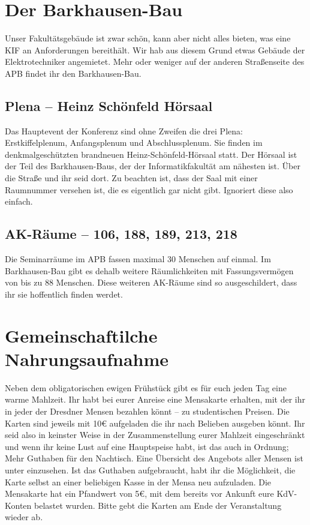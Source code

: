 \pagebreak

\section*{Der Barkhausen-Bau}
Unser Fakultätsgebäude ist zwar schön, kann aber nicht alles bieten, was eine KIF an Anforderungen bereithält.
Wir hab aus diesem Grund etwas Gebäude der Elektrotechniker angemietet.
Mehr oder weniger auf der anderen Straßenseite des APB findet ihr den Barkhausen-Bau.

\subsection*{Plena -- Heinz Schönfeld Hörsaal}
Das Hauptevent der Konferenz sind ohne Zweifen die drei Plena: Erstkiffelplenum, Anfangsplenum und Abschlussplenum.
Sie finden im denkmalgeschützten brandneuen Heinz-Schönfeld-Hörsaal statt.
Der Hörsaal ist der Teil des Barkhausen-Baus, der der Informatikfakultät am nähesten ist.
Über die Straße und ihr seid dort.
Zu beachten ist, dass der Saal mit einer Raumnummer versehen ist, die es eigentlich gar nicht gibt.
Ignoriert diese also einfach.

\subsection*{AK-Räume -- 106, 188, 189, 213, 218}
Die Seminarräume im APB fassen maximal 30 Menschen auf einmal.
Im Barkhausen-Bau gibt es dehalb weitere Räumlichkeiten mit Fassungsvermögen von bis zu 88 Menschen.
Diese weiteren AK-Räume sind so ausgeschildert, dass ihr sie hoffentlich finden werdet.

\section*{Gemeinschaftilche Nahrungsaufnahme}
Neben dem obligatorischen ewigen Frühstück gibt es für euch jeden Tag eine warme Mahlzeit.
Ihr habt bei eurer Anreise eine Mensakarte erhalten, mit der ihr in jeder der Dresdner Mensen bezahlen könnt -- zu studentischen Preisen.
Die Karten sind jeweils mit 10€ aufgeladen die ihr nach Belieben ausgeben könnt.
Ihr seid also in keinster Weise in der Zusammenstellung eurer Mahlzeit eingeschränkt und wenn ihr keine Lust auf eine Hauptspeise habt, ist das auch in Ordnung; Mehr Guthaben für den Nachtisch.
Eine Übersicht des Angebots aller Mensen ist unter  einzusehen.
Ist das Guthaben aufgebraucht, habt ihr die Möglichkeit, die Karte selbst an einer beliebigen Kasse in der Mensa neu aufzuladen.
Die Mensakarte hat ein Pfandwert von 5€, mit dem bereits vor Ankunft eure KdV-Konten belastet wurden.
Bitte gebt die Karten am Ende der Veranstaltung wieder ab.

